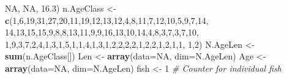 \documentclass[
]{krantz}
\makeatletter
\newenvironment{Shaded}{\begin{snugshade}}{\end{snugshade}}
\newcommand{\AttributeTok}[1]{\textcolor[rgb]{0.27,0.27,0.27}{#1}}
\newcommand{\CommentTok}[1]{\textcolor[rgb]{0.37,0.37,0.37}{\textit{#1}}}
\newcommand{\ConstantTok}[1]{\textcolor[rgb]{0.37,0.37,0.37}{#1}}
\newcommand{\DecValTok}[1]{\textcolor[rgb]{0.06,0.06,0.06}{#1}}
\newcommand{\FloatTok}[1]{\textcolor[rgb]{0.06,0.06,0.06}{#1}}
\newcommand{\FunctionTok}[1]{\textcolor[rgb]{0.27,0.27,0.27}{\textbf{#1}}}
\newcommand{\NormalTok}[1]{#1}
\newcommand{\OtherTok}[1]{\textcolor[rgb]{0.37,0.37,0.37}{#1}}
\newenvironment{kframe}{%
\medskip{}
\setlength{\fboxsep}{.8em}
 \def\at@end@of@kframe{}%
 \ifinner\ifhmode%
  \def\at@end@of@kframe{\end{minipage}}%
  \begin{minipage}{\columnwidth}%
 \fi\fi%
 \def\FrameCommand##1{\hskip\@totalleftmargin \hskip-\fboxsep
 \colorbox{shadecolor}{##1}\hskip-\fboxsep
     \hskip-\linewidth \hskip-\@totalleftmargin \hskip\columnwidth}%
 \MakeFramed {\advance\hsize-\width
   \@totalleftmargin\z@ \linewidth\hsize
   \@setminipage}}%
 {\par\unskip\endMakeFramed%
 \at@end@of@kframe}
\renewenvironment{Shaded}{\begin{kframe}}{\end{kframe}}
\makeatother
\begin{document}
\begin{Shaded}
\begin{Highlighting}[]
            \ConstantTok{NA}\NormalTok{, }\ConstantTok{NA}\NormalTok{, }\FloatTok{16.3}\NormalTok{)}
\NormalTok{n.AgeClass }\OtherTok{\textless{}{-}} \FunctionTok{c}\NormalTok{(}\DecValTok{1}\NormalTok{,}\DecValTok{6}\NormalTok{,}\DecValTok{19}\NormalTok{,}\DecValTok{31}\NormalTok{,}\DecValTok{27}\NormalTok{,}\DecValTok{20}\NormalTok{,}\DecValTok{11}\NormalTok{,}\DecValTok{19}\NormalTok{,}\DecValTok{12}\NormalTok{,}\DecValTok{13}\NormalTok{,}\DecValTok{12}\NormalTok{,}\DecValTok{4}\NormalTok{,}\DecValTok{8}\NormalTok{,}\DecValTok{11}\NormalTok{,}\DecValTok{7}\NormalTok{,}\DecValTok{12}\NormalTok{,}\DecValTok{10}\NormalTok{,}\DecValTok{5}\NormalTok{,}\DecValTok{9}\NormalTok{,}\DecValTok{7}\NormalTok{,}\DecValTok{14}\NormalTok{,}
                \DecValTok{14}\NormalTok{,}\DecValTok{13}\NormalTok{,}\DecValTok{15}\NormalTok{,}\DecValTok{15}\NormalTok{,}\DecValTok{9}\NormalTok{,}\DecValTok{8}\NormalTok{,}\DecValTok{8}\NormalTok{,}\DecValTok{13}\NormalTok{,}\DecValTok{11}\NormalTok{,}\DecValTok{9}\NormalTok{,}\DecValTok{9}\NormalTok{,}\DecValTok{16}\NormalTok{,}\DecValTok{13}\NormalTok{,}\DecValTok{10}\NormalTok{,}\DecValTok{14}\NormalTok{,}\DecValTok{4}\NormalTok{,}\DecValTok{8}\NormalTok{,}\DecValTok{3}\NormalTok{,}\DecValTok{7}\NormalTok{,}\DecValTok{3}\NormalTok{,}\DecValTok{7}\NormalTok{,}\DecValTok{10}\NormalTok{,}
                \DecValTok{1}\NormalTok{,}\DecValTok{9}\NormalTok{,}\DecValTok{3}\NormalTok{,}\DecValTok{7}\NormalTok{,}\DecValTok{2}\NormalTok{,}\DecValTok{4}\NormalTok{,}\DecValTok{1}\NormalTok{,}\DecValTok{3}\NormalTok{,}\DecValTok{1}\NormalTok{,}\DecValTok{5}\NormalTok{,}\DecValTok{1}\NormalTok{,}\DecValTok{1}\NormalTok{,}\DecValTok{4}\NormalTok{,}\DecValTok{1}\NormalTok{,}\DecValTok{3}\NormalTok{,}\DecValTok{1}\NormalTok{,}\DecValTok{2}\NormalTok{,}\DecValTok{2}\NormalTok{,}\DecValTok{2}\NormalTok{,}\DecValTok{2}\NormalTok{,}\DecValTok{1}\NormalTok{,}\DecValTok{2}\NormalTok{,}\DecValTok{2}\NormalTok{,}\DecValTok{1}\NormalTok{,}\DecValTok{2}\NormalTok{,}\DecValTok{1}\NormalTok{,}\DecValTok{1}\NormalTok{,}
                \DecValTok{1}\NormalTok{,}\DecValTok{2}\NormalTok{)}
\NormalTok{N.AgeLen }\OtherTok{\textless{}{-}} \FunctionTok{sum}\NormalTok{(n.AgeClass[])}
\NormalTok{Len }\OtherTok{\textless{}{-}} \FunctionTok{array}\NormalTok{(}\AttributeTok{data=}\ConstantTok{NA}\NormalTok{, }\AttributeTok{dim=}\NormalTok{N.AgeLen)}
\NormalTok{Age }\OtherTok{\textless{}{-}} \FunctionTok{array}\NormalTok{(}\AttributeTok{data=}\ConstantTok{NA}\NormalTok{, }\AttributeTok{dim=}\NormalTok{N.AgeLen)}
\NormalTok{fish }\OtherTok{\textless{}{-}} \DecValTok{1} \CommentTok{\# Counter for individual fish}

\end{Highlighting}
\end{Shaded}
\end{document}
